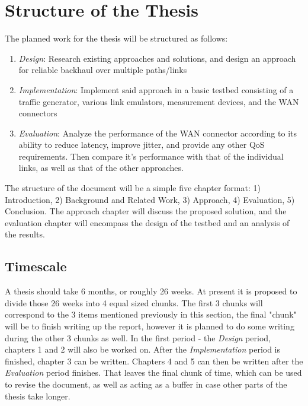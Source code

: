 \section{Structure of the Thesis}
\label{sec:structure}

The planned work for the thesis will be structured as follows:

\begin{enumerate}
\item{\textit{Design}: Research existing approaches and solutions, and design an approach for reliable backhaul over multiple paths/links}
\item{\textit{Implementation}: Implement said approach in a basic testbed consisting of a traffic generator, various link emulators, measurement devices, and the WAN connectors}
\item{\textit{Evaluation}: Analyze the performance of the WAN connector according to its ability to reduce latency, improve jitter, and provide any other QoS requirements. Then compare it's performance with that of the individual links, as well as that of the other approaches.}

\end{enumerate}

The structure of the document will be a simple five chapter format: 1) Introduction, 2) Background and Related Work, 3) Approach, 4) Evaluation, 5) Conclusion. The approach chapter will discuss the proposed solution, and the evaluation chapter will encompass the design of the testbed and an analysis of the results.

\subsection{Timescale}

A thesis should take 6 months, or roughly 26 weeks. At present it is proposed to divide those 26 weeks into 4 equal sized chunks. The first 3 chunks will correspond to the 3 items mentioned previously in this section, the final "chunk" will be to finish writing up the report, however it is planned to do some writing during the other 3 chunks as well. In the first period - the \textit{Design} period, chapters 1 and 2 will also be worked on. After the \textit{Implementation} period is finished, chapter 3 can be written. Chapters 4 and 5 can then be written after the \textit{Evaluation} period finishes. That leaves the final chunk of time, which can be used to revise the document, as well as acting as a buffer in case other parts of the thesis take longer.


